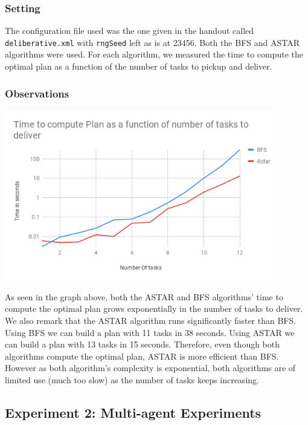 \documentclass[11pt]{article}
\begin{document}
\subsubsection{Setting}
The configuration file used was the one given in the handout called 
\texttt{deliberative.xml} with \texttt{rngSeed} left as is at 23456. 
Both the BFS and ASTAR algorithms were used. For each algorithm, 
we measured the time to compute the optimal plan as a function of the 
number of tasks to pickup and deliver.  

\subsubsection{Observations}
\begin{center}
\includegraphics[width=12cm]{time.png}
\end{center}
As seen in the graph above, both the ASTAR and BFS algorithms' time to compute the 
optimal plan grows exponentially in the number of tasks to deliver. 
We also remark that the ASTAR algorithm runs significantly faster than BFS. 
Using BFS we can build a plan with 11 tasks in 38 seconds. 
Using ASTAR we can build a plan with 13 tasks in 15 seconds. 
Therefore, even though both algorithms compute the optimal plan, 
ASTAR is more efficient than BFS. However as both algorithm's complexity 
is exponential, both algorithms are of limited use (much too slow) 
as the number of tasks keeps increasing.

\subsection{Experiment 2: Multi-agent Experiments}
\end{document}
